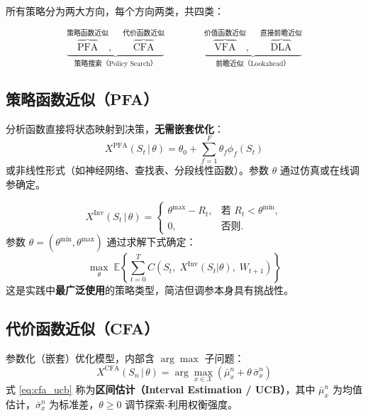 \documentclass[11pt, a4paper]{article}
\begin{document}
所有策略分为两大方向，每个方向两类，共四类：

\begin{equation}
  \underbrace{
    \overbrace{\text{PFA}}^{\text{策略函数近似}},\quad
    \overbrace{\text{CFA}}^{\text{代价函数近似}}
  }_{\text{策略搜索（Policy Search）}}\qquad\qquad
  \underbrace{
    \overbrace{\text{VFA}}^{\text{价值函数近似}},\quad
    \overbrace{\text{DLA}}^{\text{直接前瞻近似}}
  }_{\text{前瞻近似（Lookahead）}}
\end{equation}

\subsection{策略函数近似（PFA）}

分析函数直接将状态映射到决策，\textbf{无需嵌套优化}：
\begin{equation}
  X^{\text{PFA}}(S_t \,|\, \theta) = \theta_0 + \sum_{f=1}^{F} \theta_f \phi_f(S_t)
  \label{eq:pfa_linear}
\end{equation}
或非线性形式（如神经网络、查找表、分段线性函数）。参数 $\theta$ 通过仿真或在线调参确定。

\begin{tcolorbox}[scenariobox, title={PFA 应用——库存问题的订货上限策略}]
\begin{equation}
  X^{\text{Inv}}(S_t \,|\, \theta) = \begin{cases}
    \theta^{\max} - R_t, & \text{若 } R_t < \theta^{\min}, \\
    0, & \text{否则}.
  \end{cases}
  \label{eq:inventory_pfa}
\end{equation}
参数 $\theta = (\theta^{\min}, \theta^{\max})$ 通过求解下式确定：
\[
  \max_{\theta}\; \mathbb{E}\!\left\{\sum_{t=0}^{T} C(S_t,\; X^{\text{Inv}}(S_t|\theta),\; W_{t+1})\right\}
\]
这是实践中\textbf{最广泛使用}的策略类型，简洁但调参本身具有挑战性。
\end{tcolorbox}

\subsection{代价函数近似（CFA）}

参数化（嵌套）优化模型，内部含 $\arg\max$ 子问题：
\begin{equation}
  X^{\text{CFA}}(S_n \,|\, \theta) = \arg\max_{x \in \mathcal{X}}\!\left(\bar{\mu}_x^n + \theta\, \bar{\sigma}_x^n\right)
  \label{eq:cfa_ucb}
\end{equation}
式 \eqref{eq:cfa_ucb} 称为\textbf{区间估计（Interval Estimation / UCB）}，其中 $\bar{\mu}_x^n$ 为均值估计，$\bar{\sigma}_x^n$ 为标准差，$\theta \geq 0$ 调节探索-利用权衡强度。
\end{document}
